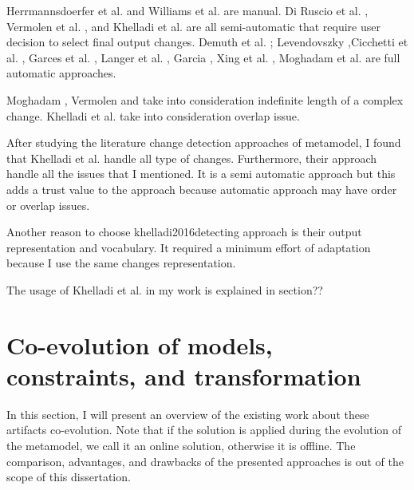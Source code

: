 Herrmannsdoerfer et al. \cite{herrmannsdoerfer2009cope} and
Williams et al. \cite{williams2012searching} are manual. Di Ruscio et al. \cite{10.1145/2000410.2000416}, Vermolen et al. \cite{vermolen_reconstructing_2012}, and Khelladi et al. \cite{khelladi2016detecting} are all semi-automatic that require user decision to select final output changes.
Demuth et al. \cite{demuth2015constraint}; Levendovszky \cite{levendovszky2014semi},Cicchetti et al. \cite{cicchetti_managing_2009}, Garces et al. \cite{garces2009managing}, Langer et al. \cite{langer_posteriori_2013}, Garcia \cite{garcia2012model}, Xing  et al. \cite{xing2006refactoring}, Moghadam et al. \cite{moghadam2012automated} are full automatic approaches.




Moghadam \cite{moghadam2012automated}, Vermolen \cite{vermolen_reconstructing_2012} and \cite{khelladi2016detecting} take into consideration indefinite length of a complex change.
Khelladi et al. \cite{khelladi2016detecting} take into consideration overlap issue.




After studying the literature change detection approaches of metamodel, I found that Khelladi et al. \cite{khelladi2016detecting} handle all type of changes. Furthermore, their approach handle all the issues that I mentioned. 
It is a semi automatic approach but this adds a trust value to the approach because automatic approach may have order or overlap issues.

Another reason to choose khelladi2016detecting approach is their output representation and vocabulary. It required a minimum effort of adaptation because I use the same changes representation.

The usage of Khelladi et al. \cite{khelladi2016detecting} in my work is explained in section??

 \section{Co-evolution of models, constraints, and transformation}
 \label{coevolutionartifacts}
  In this section, I will present an overview of the existing work about these artifacts co-evolution. Note that if the solution is applied during the evolution of the metamodel, we call it an online solution, otherwise it is offline.
 The comparison, advantages, and drawbacks of the presented approaches is out of the scope of this dissertation.
 
